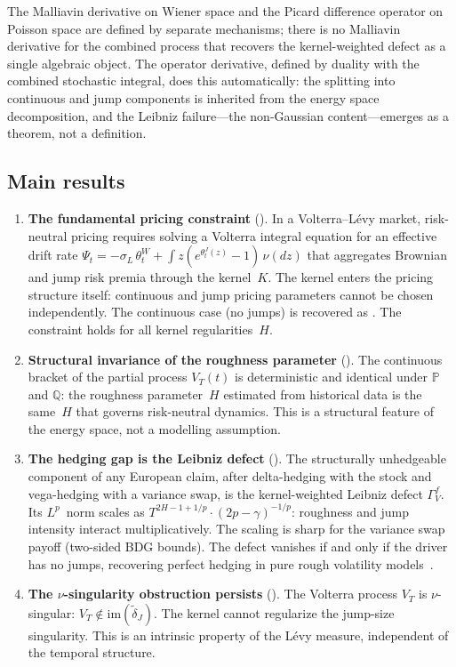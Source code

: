 \documentclass[11pt,a4paper]{article}
\theoremstyle{plain}
\theoremstyle{definition}
\theoremstyle{remark}
\begin{document}
The Malliavin derivative on Wiener space and the Picard
difference operator on Poisson space are defined by separate
mechanisms; there is no Malliavin derivative for the combined
process that recovers the kernel-weighted defect as a single
algebraic object.  The operator derivative, defined by duality
with the combined stochastic integral, does this automatically:
the splitting into continuous and jump components is inherited
from the energy space decomposition, and the Leibniz
failure---the non-Gaussian content---emerges as a theorem,
not a definition.


\subsection{Main results}

\begin{enumerate}[label=\textbf{(\Alph*)}]
\item \textbf{The fundamental pricing constraint}
  ().  In a Volterra--L\'evy market,
  risk-neutral pricing requires solving a Volterra integral
  equation for an effective drift rate
  $\Psi_t = -\sigma_L\,\theta_t^W + \int z(e^{\theta_t^J(z)}-1)\,
  \nu(dz)$
  that aggregates Brownian and jump risk premia through the
  kernel~$K$.  The kernel enters the pricing
  structure itself: continuous and jump pricing parameters
  cannot be chosen independently.  The continuous case
  (no jumps) is recovered as .
  The constraint holds for all kernel
  regularities~$H$.

\item \textbf{Structural invariance of the roughness
  parameter}
  ().  The continuous bracket of
  the partial process $V_T(t)$ is deterministic and
  identical under $\mathbb{P}$ and $\mathbb{Q}$:
  the roughness parameter~$H$ estimated from historical
  data is the same~$H$ that governs risk-neutral dynamics.
  This is a structural feature of the energy space, not
  a modelling assumption.

\item \textbf{The hedging gap is the Leibniz defect}
  ().  The
  structurally unhedgeable component of any European
  claim, after delta-hedging with the stock and
  vega-hedging with a variance swap, is the
  kernel-weighted Leibniz defect $\Gamma_V^f$.  Its
  $L^p$~norm scales as
  $T^{2H - 1 + 1/p} \cdot (2p - \gamma)^{-1/p}$:
  roughness and jump intensity interact multiplicatively.
  The scaling is sharp for the variance swap payoff
  (two-sided BDG bounds).  The defect vanishes if and
  only if the driver has no jumps, recovering
  perfect hedging in pure rough volatility
  models~\cite{ElEuchRosenbaum2019}.

\item \textbf{The $\nu$-singularity obstruction persists}
  ().  The Volterra process
  $V_T$ is $\nu$-singular:
  $V_T \notin \mathrm{im}(\widetilde{\delta}_J)$.
  The kernel cannot regularize the jump-size singularity.
  This is an intrinsic property of the L\'evy measure,
  independent of the temporal structure.
\end{enumerate}
\end{document}

